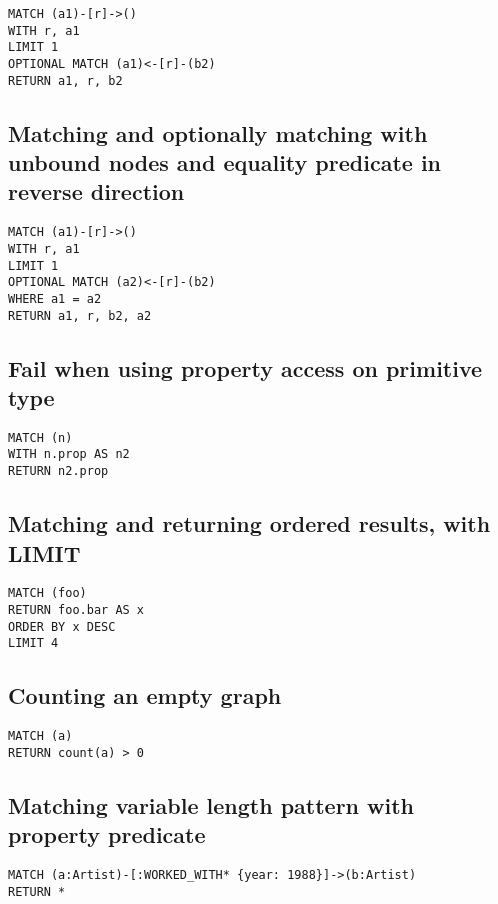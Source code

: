 \begin{lstlisting}
MATCH (a1)-[r]->()
WITH r, a1
LIMIT 1
OPTIONAL MATCH (a1)<-[r]-(b2)
RETURN a1, r, b2
\end{lstlisting}

\subsection{Matching and optionally matching with unbound nodes and equality predicate in reverse direction}

\begin{lstlisting}
MATCH (a1)-[r]->()
WITH r, a1
LIMIT 1
OPTIONAL MATCH (a2)<-[r]-(b2)
WHERE a1 = a2
RETURN a1, r, b2, a2
\end{lstlisting}

\subsection{Fail when using property access on primitive type}

\begin{lstlisting}
MATCH (n)
WITH n.prop AS n2
RETURN n2.prop
\end{lstlisting}

\subsection{Matching and returning ordered results, with LIMIT}

\begin{lstlisting}
MATCH (foo)
RETURN foo.bar AS x
ORDER BY x DESC
LIMIT 4
\end{lstlisting}

\subsection{Counting an empty graph}

\begin{lstlisting}
MATCH (a)
RETURN count(a) > 0
\end{lstlisting}

\subsection{Matching variable length pattern with property predicate}

\begin{lstlisting}
MATCH (a:Artist)-[:WORKED_WITH* {year: 1988}]->(b:Artist)
RETURN *
\end{lstlisting}

